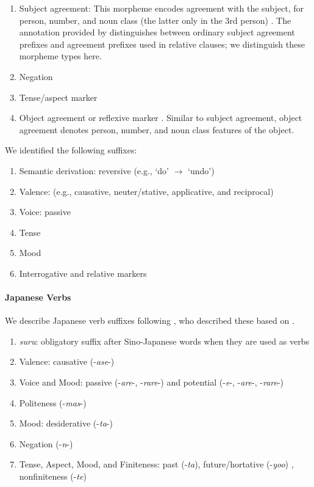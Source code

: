 \documentclass[11pt,letterpaper]{article}
\begin{document}
\begin{enumerate}
    \item Subject agreement: This morpheme encodes agreement with the subject, for person, number, and noun class (the latter only in the 3rd person) \cite[]{doke1967textbook}.
            The annotation provided by \cite{demuth1992acquisition} distinguishes between ordinary subject agreement prefixes and agreement prefixes used in relative clauses; we distinguish these morpheme types here.

    \item Negation \citep[]{doke1967textbook}

    \item Tense/aspect marker   \citep[--424]{doke1967textbook}

    \item Object agreement or reflexive marker \citep[]{doke1967textbook}.
    Similar to subject agreement, object agreement denotes person, number, and noun class features of the object.
\end{enumerate}
We identified the following suffixes:

\begin{enumerate}
\item Semantic derivation: reversive (e.g., `do' $\rightarrow$ `undo')
\item Valence: (e.g., causative, neuter/stative, applicative, and reciprocal)
    \item Voice: passive
    \item Tense
    \item Mood
    \item Interrogative and relative markers
\end{enumerate}



\paragraph{Japanese Verbs}
We describe Japanese verb suffixes following \citep{Hahn2020modeling}, who described these based on \citep{kaiser2013japanese,hasegawa2014japanese}.

\begin{enumerate}
\item \textit{suru}: obligatory suffix after Sino-Japanese words when they are used as verbs
\item Valence: causative (-\textit{ase}-)
\item Voice and Mood: passive (-\textit{are}-, -\textit{rare}-) and potential (-\textit{e}-, -\textit{are}-, -\textit{rare}-)
\item Politeness (-\textit{mas}-)
\item Mood: desiderative (-\textit{ta}-)
\item Negation (-\textit{n}-)
\item Tense, Aspect, Mood, and Finiteness: past (-\textit{ta}), future/hortative (-\textit{yoo}) \citep[229]{kaiser2013japanese}, nonfiniteness (-\textit{te})
\end{enumerate}
\end{document}
